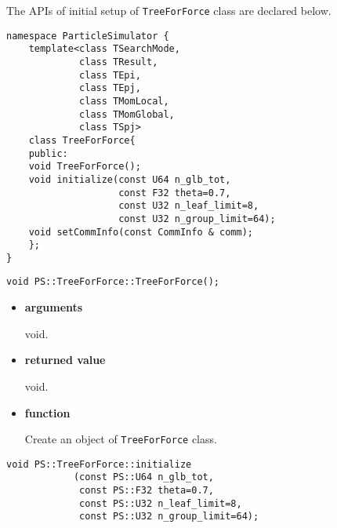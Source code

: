 The APIs of initial setup of {\tt TreeForForce} class are declared
below.

\begin{lstlisting}[caption=TreeForForce1]
namespace ParticleSimulator {
    template<class TSearchMode,
             class TResult,
             class TEpi,
             class TEpj,
             class TMomLocal,
             class TMomGlobal,
             class TSpj>
    class TreeForForce{
    public:
    void TreeForForce();
    void initialize(const U64 n_glb_tot,
                    const F32 theta=0.7,
                    const U32 n_leaf_limit=8,
                    const U32 n_group_limit=64);
    void setCommInfo(const CommInfo & comm);
    };
}
\end{lstlisting}



\begin{screen}
\begin{verbatim}
void PS::TreeForForce::TreeForForce();
\end{verbatim}
\end{screen}

\begin{itemize}

\item {\bf arguments}

void.

\item {\bf returned value}

void.

\item {\bf function}

Create an object of {\tt TreeForForce} class.

\end{itemize}


\begin{screen}
\begin{verbatim}
void PS::TreeForForce::initialize
            (const PS::U64 n_glb_tot,
             const PS::F32 theta=0.7,
             const PS::U32 n_leaf_limit=8,
             const PS::U32 n_group_limit=64);
\end{verbatim}
\end{screen}

